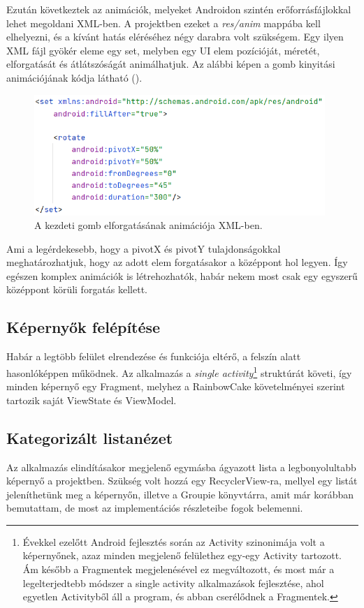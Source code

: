 Ezután következtek az animációk, melyeket Androidon szintén erőforrásfájlokkal lehet megoldani XML-ben. A projektben ezeket a \emph{res/anim} mappába kell elhelyezni, és a kívánt hatás eléréséhez négy darabra volt szükségem. Egy ilyen XML fájl gyökér eleme egy set, melyben egy UI elem pozícióját, méretét, elforgatását és átlátszóságát animálhatjuk. Az alábbi képen a gomb kinyitási animációjának kódja látható ().

\begin{figure}[!ht]
	\centering
	\includegraphics[width=110mm, keepaspectratio]{figures/animation_example.png}
	\caption{A kezdeti gomb elforgatásának animációja XML-ben.}
	\label{fig:ButtonAnimation}
\end{figure}

Ami a legérdekesebb, hogy a pivotX és pivotY tulajdonságokkal meghatározhatjuk, hogy az adott elem forgatásakor a középpont hol legyen. Így egészen komplex animációk is létrehozhatók, habár nekem most csak egy egyszerű középpont körüli forgatás kellett.

\subsection{Képernyők felépítése}
Habár a legtöbb felület elrendezése és funkciója eltérő, a felszín alatt hasonlóképpen működnek. Az alkalmazás a \emph{single activity}\footnote{Évekkel ezelőtt Android fejlesztés során az Activity szinonimája volt a képernyőnek, azaz minden megjelenő felülethez egy-egy Activity tartozott. Ám később a Fragmentek megjelenésével ez megváltozott, és most már a legelterjedtebb módszer a single activity alkalmazások fejlesztése, ahol egyetlen Activityből áll a program, és abban cserélődnek a Fragmentek.} struktúrát követi, így minden képernyő egy Fragment, melyhez a RainbowCake követelményei szerint tartozik saját ViewState és ViewModel. 



\subsection{Kategorizált listanézet}
Az alkalmazás elindításakor megjelenő egymásba ágyazott lista a legbonyolultabb képernyő a projektben. Szükség volt hozzá egy RecyclerView-ra, mellyel egy listát jeleníthetünk meg a képernyőn, illetve a Groupie könyvtárra, amit már korábban bemutattam, de most az implementációs részleteibe fogok belemenni. 

